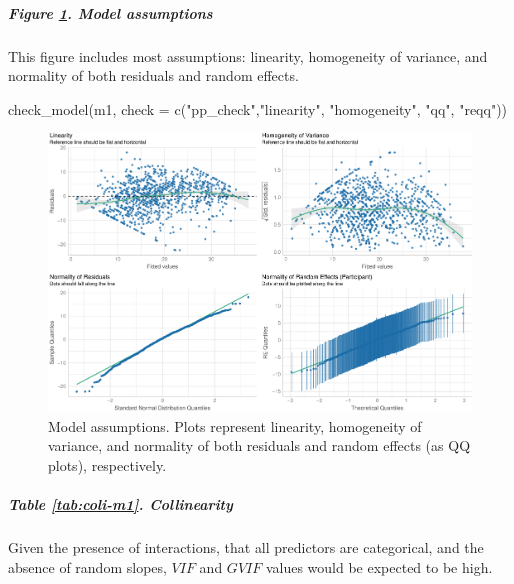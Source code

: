\documentclass[
  bookmarksnumbered]{article}
\newenvironment{Shaded}{\begin{snugshade}}{\end{snugshade}}
\newcommand{\AttributeTok}[1]{\textcolor[rgb]{0.80,0.80,0.80}{#1}}
\newcommand{\FunctionTok}[1]{\textcolor[rgb]{0.94,0.94,0.56}{#1}}
\newcommand{\NormalTok}[1]{\textcolor[rgb]{0.80,0.80,0.80}{#1}}
\newcommand{\StringTok}[1]{\textcolor[rgb]{0.80,0.58,0.58}{#1}}
\begin{document}
\hypertarget{figure-reffigassu-m1.-model-assumptions}{%
\subparagraph{Figure \ref{fig:assu-m1}. Model assumptions}\label{figure-reffigassu-m1.-model-assumptions}}

This figure includes most assumptions: linearity, homogeneity of variance, and normality of both residuals and random effects.

\begin{Shaded}
\begin{Highlighting}[]
\FunctionTok{check\_model}\NormalTok{(m1,}
            \AttributeTok{check =} \FunctionTok{c}\NormalTok{(}\StringTok{"pp\_check"}\NormalTok{,}\StringTok{"linearity"}\NormalTok{, }\StringTok{"homogeneity"}\NormalTok{, }\StringTok{"qq"}\NormalTok{, }\StringTok{"reqq"}\NormalTok{))}
\end{Highlighting}
\end{Shaded}

\begin{figure}
\centering
\includegraphics{Deseo_excitacion_sexual_files/figure-latex/assu-m1-1.pdf}
\caption{\label{fig:assu-m1}Model assumptions. Plots represent linearity, homogeneity of variance, and normality of both residuals and random effects (as QQ plots), respectively.}
\end{figure}

\hypertarget{table-reftabcoli-m1.-collinearity}{%
\subparagraph{Table \ref{tab:coli-m1}. Collinearity}\label{table-reftabcoli-m1.-collinearity}}

Given the presence of interactions, that all predictors are categorical, and the absence of random slopes, \(VIF\) and \(GVIF\) values would be expected to be high.
\end{document}
